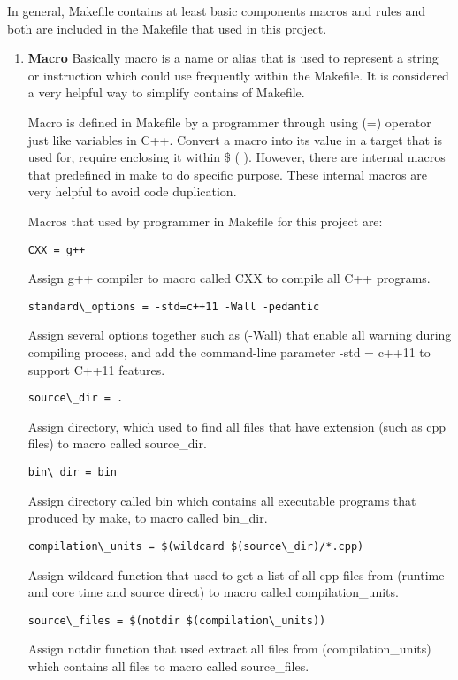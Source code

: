 \documentclass[11pt]{report}
\begin{document}
In general, Makefile contains at least basic components macros and rules and both are included in the Makefile that used in this project.

\begin{enumerate}
\item \textbf{Macro} Basically macro is a name or alias that is used to represent a string or instruction which could use frequently within the Makefile.  It is considered a very helpful way to simplify contains of Makefile.

Macro is defined in Makefile by a programmer through using (=) operator just like variables in C++. Convert a macro into its value in a target that is used for, require enclosing it within \$ ( ). However, there are internal macros that predefined in make to do specific purpose. These internal macros are very helpful to avoid code duplication.

Macros that used by programmer in Makefile for this project are:
\begin{verbatim}
CXX = g++ 
\end{verbatim}
Assign g++ compiler to macro called CXX to compile all C++ programs.

\begin{verbatim}
standard\_options = -std=c++11 -Wall -pedantic
\end{verbatim}
Assign several options together such as (-Wall) that enable all warning during compiling process, and add the command-line parameter -std = c++11 to support C++11 features.

\begin{verbatim}
source\_dir = .
\end{verbatim}
Assign directory, which used to find all files that have extension (such as cpp files)  to macro called source\_dir.

\begin{verbatim}
bin\_dir = bin
\end{verbatim}
Assign directory called bin which contains all executable programs that produced by make, to macro called bin\_dir.

\begin{verbatim}
compilation\_units = $(wildcard $(source\_dir)/*.cpp)
\end{verbatim}
Assign wildcard function that used to get a list of all cpp files from (runtime and core time and source direct) to macro called compilation\_units.

\begin{verbatim}
source\_files = $(notdir $(compilation\_units))
\end{verbatim}
Assign notdir function that used extract all files from (compilation\_units) which contains all files to macro called source\_files.


\end{enumerate}
\end{document}
